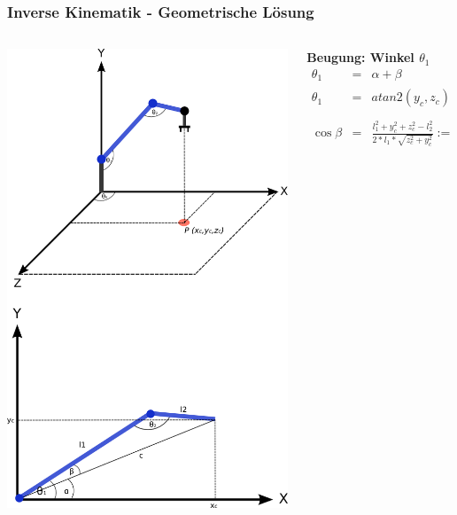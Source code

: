 \begin{frame}
\frametitle{Inverse Kinematik - Geometrische Lösung}
\begin{columns}
\begin{column}{.32\textwidth}
\includegraphics[scale=0.2]{imgs/inverseKinematik.png}
\end{column}%
\begin{column}{.72\textwidth}
\textbf{Beugung: Winkel $\theta_1$}
\small \begin{eqnarray*}
\theta_1 &=& \alpha + \beta \\
\theta_1 &=& atan2(y_c, z_c) + atan2(E, \pm \sqrt{1-E^2}) \\ \\
\cos \beta &=& \frac{l_1^2 + y_c^2 + z_c^2 - l_2^2}{2*l_1*\sqrt{z_c^2 + y_c^2}} := E 
\end{eqnarray*}
\end{column}
\end{columns}
\end{frame}

